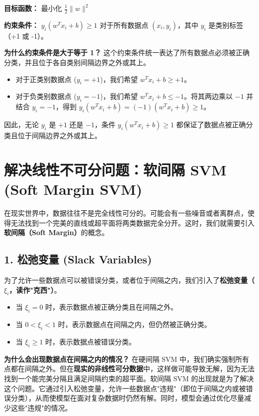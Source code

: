 \documentclass{article}
\begin{document}
\textbf{目标函数：}
最小化 $\frac{1}{2} \|w\|^2$

\textbf{约束条件：}
$y_i (w^T x_i + b) \ge 1$
对于所有数据点 $(x_i, y_i)$，其中 $y_i$ 是类别标签（+1 或 -1）。

\textbf{为什么约束条件是大于等于 1？}
这个约束条件统一表达了所有数据点必须被正确分类，并且位于各自类别间隔边界之外或其上。
\begin{itemize}
    \item 对于正类别数据点 ($y_i = +1$)，我们希望 $w^T x_i + b \ge +1$。
    \item 对于负类别数据点 ($y_i = -1$)，我们希望 $w^T x_i + b \le -1$。将其两边乘以 $-1$ 并结合 $y_i = -1$，得到 $y_i(w^T x_i + b) = (-1)(w^T x_i + b) \ge 1$。
\end{itemize}
因此，无论 $y_i$ 是 $+1$ 还是 $-1$，条件 $y_i (w^T x_i + b) \ge 1$ 都保证了数据点被正确分类且位于间隔边界之外或其上。



\section*{解决线性不可分问题：软间隔 SVM (Soft Margin SVM)}
在现实世界中，数据往往不是完全线性可分的。可能会有一些噪音或者离群点，使得无法找到一个完美的直线或超平面将两类数据完全分开。这时，我们就需要引入\textbf{软间隔（Soft Margin）}的概念。

\subsection*{1. 松弛变量 (Slack Variables)}
为了允许一些数据点可以被错误分类，或者位于间隔之内，我们引入了\textbf{松弛变量（$\xi_i$，读作"克西"）}。
\begin{itemize}
    \item 当 $\xi_i = 0$ 时，表示数据点被正确分类且在间隔之外。
    \item 当 $0 < \xi_i < 1$ 时，表示数据点在间隔之内，但仍然被正确分类。
    \item 当 $\xi_i \ge 1$ 时，表示数据点被错误分类。
\end{itemize}

\textbf{为什么会出现数据点在间隔之内的情况？}
在硬间隔 SVM 中，我们确实强制所有点都在间隔之外。但在\textbf{现实的非线性可分数据}中，这样做可能导致无解，因为无法找到一个能完美分隔且满足间隔约束的超平面。软间隔 SVM 的出现就是为了解决这个问题。它通过引入松弛变量，允许一些数据点"违规"（即位于间隔之内或被错误分类），从而使模型在面对复杂数据时仍然有解。同时，模型会通过优化尽量减少这些"违规"的情况。
\end{document}
